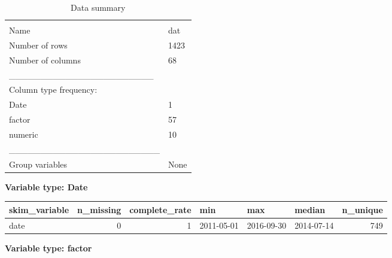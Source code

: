 \documentclass[
]{article}
\begin{document}
\begin{longtable}[]{@{}ll@{}}
\caption{Data summary}\tabularnewline
\toprule
& \\
\midrule
\endfirsthead
\toprule
& \\
\midrule
\endhead
Name & dat \\
Number of rows & 1423 \\
Number of columns & 68 \\
\_\_\_\_\_\_\_\_\_\_\_\_\_\_\_\_\_\_\_\_\_\_\_ & \\
Column type frequency: & \\
Date & 1 \\
factor & 57 \\
numeric & 10 \\
\_\_\_\_\_\_\_\_\_\_\_\_\_\_\_\_\_\_\_\_\_\_\_\_ & \\
Group variables & None \\
\bottomrule
\end{longtable}

\textbf{Variable type: Date}

\begin{longtable}[]{@{}lrrlllr@{}}
\toprule
skim\_variable & n\_missing & complete\_rate & min & max & median &
n\_unique \\
\midrule
\endhead
date & 0 & 1 & 2011-05-01 & 2016-09-30 & 2014-07-14 & 749 \\
\bottomrule
\end{longtable}

\textbf{Variable type: factor}
\end{document}
